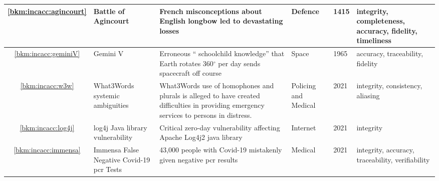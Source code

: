 \begin{longtable}{|C{}|L{}|L{}|L{}|L{}|L{}|}
  \hline
  \ref{bkm:incacc:agincourt} &%
  Battle of Agincourt &%
  French misconceptions about English longbow led to devastating losses &%
  Defence &%
  1415 &%
  \Gls{integrity}, \gls{completeness},
  \gls{accuracy}, \gls{fidelity},
  \gls{timeliness}\\
  \hline
  \ref{bkm:incacc:geminiV} & Gemini V &
  Erroneous `` schoolchild knowledge'' that Earth rotates 360$^\circ$ per day sends spacecraft off course
  &
  Space & 1965 & \Gls{accuracy},
  \gls{traceability},
  \gls{fidelity}\\
  \hline
  \ref{bkm:incacc:w3w} & What3Words systemic ambiguities &
  What3Words use of homophones and plurals is alleged to have created difficulties in providing emergency services
  to persons in distress.
  &
  Policing and Medical & 2021 & \Gls{integrity},
  \gls{consistency},
  \gls{aliasing}\\
  \hline
    \ref{bkm:incacc:log4j} & log4j Java library vulnerability &
    Critical zero-day vulnerability affecting Apache Log4j2 java library &
    Internet & 2021 & \Gls{integrity}\\
    \hline
    \ref{bkm:incacc:immensa} & Immensa False Negative Covid-19 \gls{pcr} Tests &
    43,000 people with Covid-19 mistakenly given negative \gls{pcr} results &
    Medical & 2021 & \Gls{integrity}, \gls{accuracy}, \gls{traceability}, \gls{verifiability}\\

\end{longtable}
